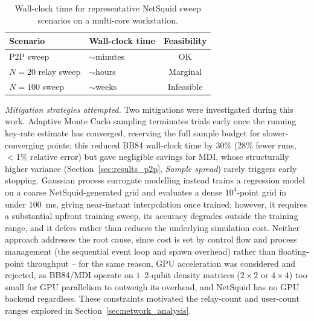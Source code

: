 \documentclass[12pt]{article}
\begin{document}
\begin{table}[htbp]
\centering
\begin{tabular}{llc}
\toprule
Scenario & Wall-clock time & Feasibility \\
\midrule
P2P sweep         & $\sim$minutes & OK \\
$N{=}20$ relay sweep & $\sim$hours   & Marginal \\
$N{=}100$ sweep      & $\sim$weeks   & Infeasible \\
\bottomrule
\end{tabular}
\caption{Wall-clock time for representative NetSquid sweep scenarios on a multi-core workstation.}
\label{tab:timing}
\end{table}

\textit{Mitigation strategies attempted.} Two mitigations were investigated during this work. Adaptive Monte Carlo sampling terminates trials early once the running key-rate estimate has converged, reserving the full sample budget for slower-converging points; this reduced BB84 wall-clock time by 30\% (28\% fewer runs, $<$1\% relative error) but gave negligible savings for MDI, whose structurally higher variance (Section~\ref{sec:results_p2p}, \textit{Sample spread}) rarely triggers early stopping. Gaussian process surrogate modelling instead trains a regression model on a coarse NetSquid-generated grid and evaluates a dense $10^4$-point grid in under 100~ms, giving near-instant interpolation once trained; however, it requires a substantial upfront training sweep, its accuracy degrades outside the training range, and it defers rather than reduces the underlying simulation cost. Neither approach addresses the root cause, since cost is set by control flow and process management (the sequential event loop and spawn overhead) rather than floating-point throughput -- for the same reason, GPU acceleration was considered and rejected, as BB84/MDI operate on $1$--$2$-qubit density matrices ($2{\times}2$ or $4{\times}4$) too small for GPU parallelism to outweigh its overhead, and NetSquid has no GPU backend regardless. These constraints motivated the relay-count and user-count ranges explored in Section~\ref{sec:network_analysis}.
\end{document}
